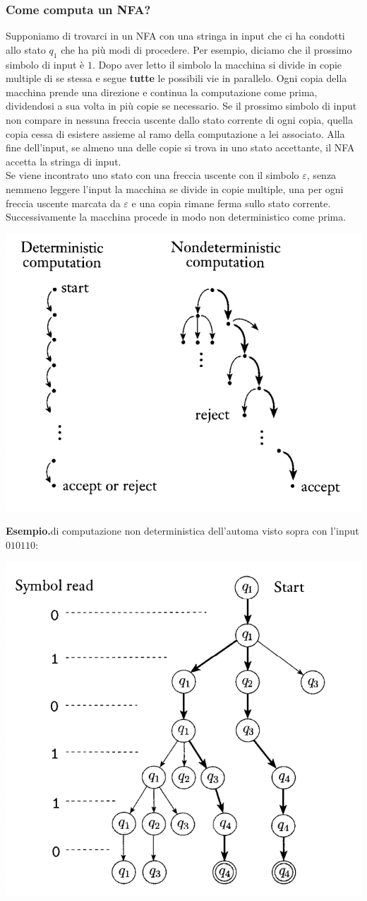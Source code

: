 \documentclass[italian]{article}
\newcommand{\example}{\noindent\textbf{Esempio.\quad}}
\begin{document}
\subsubsection{Come computa un NFA?}
Supponiamo di trovarci in un NFA con una stringa in input che ci ha condotti allo stato $q_1$ che ha più modi di procedere. Per esempio, diciamo che il prossimo simbolo di input è $1$. Dopo aver letto il simbolo la macchina si divide in copie multiple di se stessa e segue \textbf{tutte} le possibili vie in parallelo. Ogni copia della macchina prende una direzione e continua la computazione come prima, dividendosi a sua volta in più copie se necessario. Se il prossimo simbolo di input non compare in nessuna freccia uscente dallo stato corrente di ogni copia, quella copia cessa di esistere assieme al ramo della computazione a lei associato. Alla fine dell'input, se almeno una delle copie si trova in uno stato accettante, il NFA accetta la stringa di input. \\
Se viene incontrato uno stato con una freccia uscente con il simbolo $\varepsilon$, senza nemmeno leggere l'input la macchina se divide in copie multiple, una per ogni freccia uscente marcata da $\varepsilon$ e una copia rimane ferma sullo stato corrente. Successivamente la macchina procede in modo non deterministico come prima.
\begin{center}
	\includegraphics[width=0.5\linewidth]{images/nondeterministic}
\end{center}
\example di computazione non deterministica dell'automa visto sopra con l'input $010110$:
\begin{center}
	\includegraphics[width=0.7\linewidth]{images/branches}
\end{center}
\end{document}
